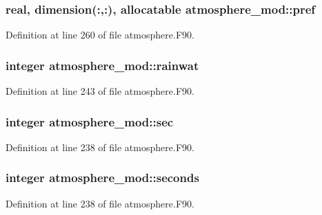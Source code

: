 \subsubsection[{pref}]{\setlength{\rightskip}{0pt plus 5cm}real, dimension(\-:,\-:), allocatable atmosphere\-\_\-mod\-::pref\hspace{0.3cm}{\ttfamily [private]}}\label{classatmosphere__mod_a532d3470860edef9ff203c5fc8e0b39d}


Definition at line 260 of file atmosphere.\-F90.

\subsubsection[{rainwat}]{\setlength{\rightskip}{0pt plus 5cm}integer atmosphere\-\_\-mod\-::rainwat\hspace{0.3cm}{\ttfamily [private]}}\label{classatmosphere__mod_ad9345d06c2a877903e3bfdfb529a2a63}


Definition at line 243 of file atmosphere.\-F90.

\subsubsection[{sec}]{\setlength{\rightskip}{0pt plus 5cm}integer atmosphere\-\_\-mod\-::sec\hspace{0.3cm}{\ttfamily [private]}}\label{classatmosphere__mod_abe192872a4a5b42159d0c2251ac9cb14}


Definition at line 238 of file atmosphere.\-F90.

\subsubsection[{seconds}]{\setlength{\rightskip}{0pt plus 5cm}integer atmosphere\-\_\-mod\-::seconds\hspace{0.3cm}{\ttfamily [private]}}\label{classatmosphere__mod_aafb92c94f8850295ad027e0538ae78ca}


Definition at line 238 of file atmosphere.\-F90.

